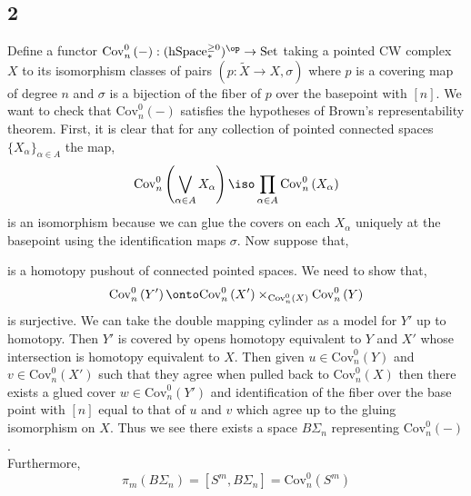 \documentclass[12pt]{extarticle}
\begin{document}
\subsection*{2}

\newcommand{\Cov}[1]{\mathrm{Cov}^0_n\left(#1\right)}

Define a functor $\Cov{-} : (\mathrm{hSpace}_*^{\ge 0})^\op \to \mathrm{Set}$ taking a pointed CW complex $X$ to its isomorphism classes of pairs $(p : \tilde{X} \to X, \sigma)$ where $p$ is a covering map of degree $n$ and $\sigma$ is a bijection of the fiber of $p$ over the basepoint with $[n]$. We want to check that $\Cov{-}$ satisfies the hypotheses of Brown's representability theorem. First, it is clear that for any collection of pointed connected spaces $\{ X_\alpha \}_{\alpha \in A}$ the map,
\[ \Cov{\bigvee_{\alpha \in A} X_\alpha} \iso \prod_{\alpha \in A} \Cov{X_\alpha} \]
is an isomorphism because we can glue the covers on each $X_\alpha$ uniquely at the basepoint using the identification maps $\sigma$. Now suppose that,
\begin{center}
\end{center}
is a homotopy pushout of connected pointed spaces. We need to show that,
\[ \Cov{Y'} \onto \Cov{X'} \times_{\Cov{X}} \Cov{Y} \]
is surjective. We can take the double mapping cylinder as a model for $Y'$ up to homotopy. Then $Y'$ is covered by opens homotopy equivalent to $Y$ and $X'$ whose intersection is homotopy equivalent to $X$. Then given $u \in \Cov{Y}$ and $v \in \Cov{X'}$ such that they agree when pulled back to $\Cov{X}$ then there exists a glued cover $w \in \Cov{Y'}$ and identification of the fiber over the base point with $[n]$ equal to that of $u$ and $v$ which agree up to the gluing isomorphism on $X$. Thus we see there exists a space $B \Sigma_n$ representing $\Cov{-}$. 
\bigskip\\
Furthermore,
\[ \pi_m(B \Sigma_n) = [S^m, B \Sigma_n] = \Cov{S^m} \]
\end{document}
